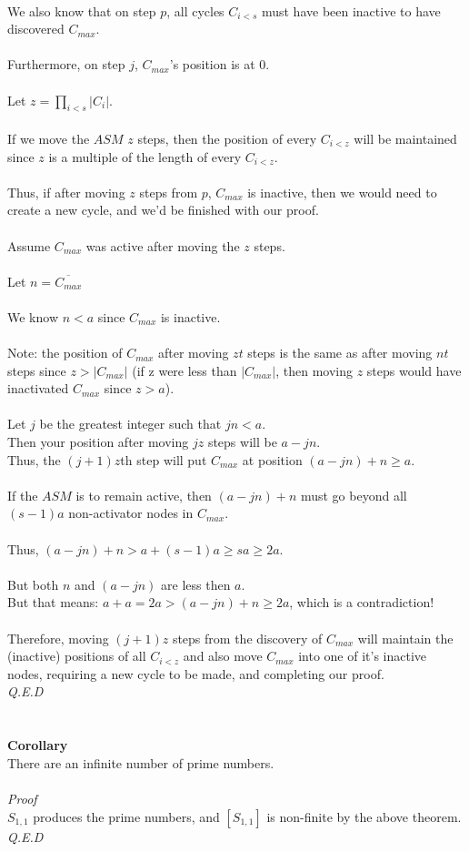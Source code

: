 \documentclass[a4paper,12pt]{article}
\begin{document}
\\
We also know that on step $p$, all cycles $C_{i<s}$ must have been inactive to have discovered $C_{max}$.\\
\\
Furthermore, on step $j$, $C_{max}$'s position is at 0.\\
\\
Let $z = \prod_{i<s}|C_i|$.\\
\\
If we move the $ASM$ $z$ steps, then the position of every $C_{i<z}$ will be maintained since $z$ is a multiple of the length of every $C_{i<z}$.\\
\\
Thus, if after moving $z$ steps from $p$, $C_{max}$ is inactive, then we would need to create a new cycle, and we'd be finished with our proof.\\
\\
Assume $C_{max}$ was active after moving the $z$ steps.\\
\\
Let $n =\overline{C_{max}}$\\
\\
We know $n < a$ since $C_{max}$ is inactive.\\
\\
Note: the position of $C_{max}$ after moving $zt$ steps is the same as after moving $nt$ steps since $z > |C_{max}|$ (if z were less than $|C_{max}|$, then moving $z$ steps would have inactivated $C_{max}$ since $z > a$).\\
\\
Let $j$ be the greatest integer such that $jn < a$.\\
Then your position after moving $jz$ steps will be $a - jn$.\\
Thus, the $(j+1)z$th step will put $C_{max}$ at position $(a-jn)+n \geq a$.\\   
\\
If the $ASM$ is to remain active, then $(a-jn)+n$ must go beyond all $(s-1)a$ non-activator nodes in $C_{max}$.\\
\\
Thus, $(a-jn)+n > a + (s-1)a \geq sa \geq 2a$.\\
\\
But both $n$ and $(a-jn)$ are less then $a$.\\
But that means: $a + a = 2a > (a-jn)+n \geq 2a$, which is a contradiction!\\
\\
Therefore, moving $(j+1)z$ steps from the discovery of $C_{max}$ will maintain the (inactive) positions of all $C_{i<z}$ and also move $C_{max}$ into one of it's inactive nodes, requiring a new cycle to be made, and completing our proof.\\
\textit{Q.E.D}\\   
\\
\\
\textbf{Corollary}\\
There are an infinite number of prime numbers.\\
\\
\textit{Proof}\\ 
$S_{1,1}$ produces the prime numbers, and $[S_{1,1}]$ is non-finite by the above theorem.\\
\textit{Q.E.D}
\end{document}
